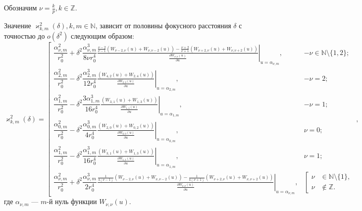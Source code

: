 Обозначим $\nu = \frac{k}{p}, k \in \mathbb{Z}$. 
\begin{theorem}
	Значение $\varkappa^2_{k,m}(\delta), k, m \in \mathbb{N}$, зависит от половины фокусного расстояния $\delta$ с точностью до $o(\delta^2)$ следующим образом:
{\small
\begin{equation}
\varkappa^2_{k,m}(\delta) = \left[
\begin{array}{cc}
\dfrac{\alpha_{\nu, m}^2}{r_0^2} + \delta^2 \dfrac{\alpha_{\nu, m}^3}{8 \nu r_0^4} \left. \frac{
\frac{\nu-2}{\nu-1}
\left(
W_{\nu-2, \nu}(u) + W_{\nu, \nu-2}(u)
\right)- 
\frac{\nu+2}{\nu+1}
\left(
W_{\nu+2, \nu}(u) + W_{\nu, \nu+2}(u)
\right)
}{ \frac{\partial W_{\nu,\nu}(u)}{\partial u} }\right|_{u=\alpha_{\nu, m}},  & -\nu \in \mathbb{N} \setminus \{1, 2\}; \\

\dfrac{\alpha_{2, m}^2}{r_0^2} - \delta^2 \dfrac{\alpha_{2, m}^3}{12  r_0^4} \left. \frac{
	\left(
	W_{4, 2}(u) + W_{2, 4}(u)
	\right)
}{ \frac{\partial W_{2,2}(u)}{\partial u} }\right|_{u=\alpha_{2, m}}, & -\nu=2; \\

\dfrac{\alpha_{1, m}^2}{r_0^2} - \delta^2 \dfrac{3 \alpha_{1, m}^3 }{16 r_0^4}
\left. \frac{
	\left(
	W_{3, 1}(u) + W_{1, 3}(u)
	\right)
}{ \frac{\partial W_{1,1}(u)}{\partial u} }\right|_{u=\alpha_{1, m}}, & -\nu=1; \\


\dfrac{\alpha_{0, m}^2}{r_0^2} - \delta^2 \dfrac{\alpha_{0, m}^3}{4r_0^4} \left. \frac{
 \left( W_{2, 0}(u) + W_{0, 2}(u) \right)
}{ \frac{\partial W_{0,0}(u)}{\partial u} }\right|_{u=\alpha_{0, m}}, & \nu=0;   \\

\dfrac{\alpha_{1, m}^2}{r_0^2} - \delta^2 \dfrac{\alpha_{1, m}^3}{16 r_0^4} \left. \frac{ \left( W_{3, 1}(u) + W_{1, 3}(u) \right)
}{ \frac{\partial W_{1,1}(u)}{\partial u} }\right|_{u=\alpha_{1, m}},    & \nu=1;\\

\dfrac{\alpha_{\nu, m}^2}{r_0^2} + \delta^2 \dfrac{\alpha_{\nu, m}^3}{2 r_0^4} \left. \frac{
\frac{1}{4(\nu-1)} \left( W_{\nu-2, \nu}(u) + W_{\nu, \nu-2}(u) \right) - \frac{1}{4(\nu+1)} \left( W_{\nu+2, \nu}(u) + W_{\nu, \nu+2}(u) \right)
}{ \frac{\partial W_{\nu,\nu}(u)}{\partial u} }\right|_{u=\alpha_{\nu, m}},
&   \left[
\begin{aligned}
\nu &\in \mathbb{N} \setminus \{1\},\\
\nu &\notin \mathbb{Z}.
\end{aligned}
\right.
\end{array}
\right.,
\label{eq:valRing}
\end{equation}
}
где $\alpha_{\nu, m}$ --- $m$-й нуль функции $W_{\nu, \nu}(u)$.
\label{th:sect2_th4}
\end{theorem}

